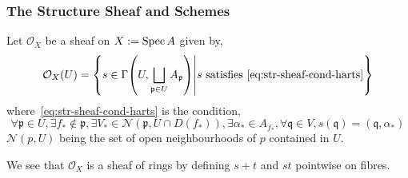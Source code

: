 \documentclass[000-main.tex]{subfiles}
\begin{document}
\subsubsection{The Structure Sheaf and Schemes}%
\label{sec:structure-sheaf}

\begin{definition}
  Let $\mathcal{O}_X$ be a sheaf on $X := \operatorname{Spec} A$ given by,
  \[
    \mathcal{O}_X(U) = \qty{
      s \in \Gamma\qty(U, \bigsqcup_{\mathfrak{p} \in U} A_{\mathfrak{p}})
      \middle\vert
      s\text{ satisfies~\eqref{eq:str-sheaf-cond-harts}}
    }
  \]
  where~\eqref{eq:str-sheaf-cond-harts} is the condition,
  \begin{equation}\label{eq:str-sheaf-cond-harts}
      \forall \mathfrak{p}\in U,
      \exists f_{\ast} \not\in \mathfrak{p},
      \exists V_{\ast}\in \mathcal{N}(\mathfrak{p}, U\cap D(f_{\ast})),
      \exists \alpha_{\ast} \in A_{f_\ast},
      \forall \mathfrak{q} \in V, s(\mathfrak{q}) = (\mathfrak{q}, \alpha_{\ast})
      \tag{\ast}
  \end{equation}
  $\mathcal{N}(p, U)$ being the set of open neighbourhoods of $p$ contained in $U$.

  We see that $\mathcal{O}_X$ is a sheaf of rings by defining $s + t$ and $st$ pointwise on fibres.
\end{definition}
\end{document}
